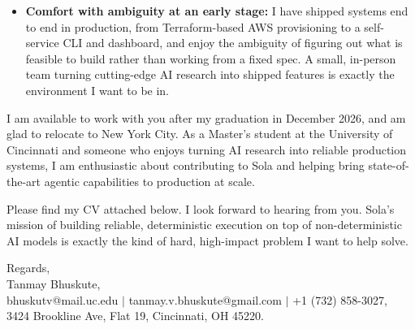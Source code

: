 \documentclass[11pt]{letter}
\begin{document}
\begin{letter}{}
\begin{itemize}[leftmargin=*, itemsep=0.45em]
    \item \textbf{Comfort with ambiguity at an early stage:} I have shipped systems end to end in production, from Terraform-based AWS provisioning to a self-service CLI and dashboard, and enjoy the ambiguity of figuring out what is feasible to build rather than working from a fixed spec. A small, in-person team turning cutting-edge AI research into shipped features is exactly the environment I want to be in.
\end{itemize}

I am available to work with you after my graduation in December 2026, and am glad to relocate to New York City. As a Master's student at the University of Cincinnati and someone who enjoys turning AI research into reliable production systems, I am enthusiastic about contributing to Sola and helping bring state-of-the-art agentic capabilities to production at scale.

Please find my CV attached below. I look forward to hearing from you. Sola's mission of building reliable, deterministic execution on top of non-deterministic AI models is exactly the kind of hard, high-impact problem I want to help solve.

{\setlength{\parskip}{0pt}
Regards,\\
Tanmay Bhuskute,\\
bhuskutv@mail.uc.edu $\mid$ tanmay.v.bhuskute@gmail.com $\mid$ +1 (732) 858-3027,\\
3424 Brookline Ave, Flat 19, Cincinnati, OH 45220.
}

\end{letter}
\end{document}
